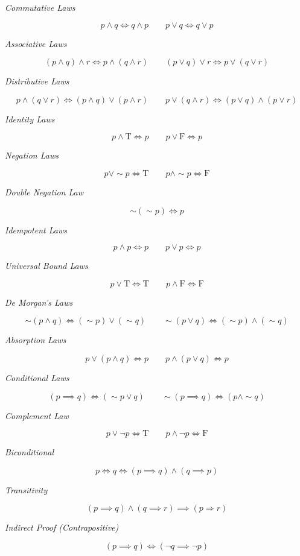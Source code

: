 \emph{Commutative Laws}

\[
	p \land q \iff q \land p \qquad p \lor q \iff q \lor p
\]

\emph{Associative Laws}

\[
	(p \land q) \land r \iff p \land (q \land r) \qquad (p \lor q) \lor r \iff p \lor (q \lor r)
\]

\emph{Distributive Laws}

\[
	p \land (q \lor r) \iff (p \land q) \lor (p \land r) \qquad
	p \lor (q \land r) \iff (p \lor q) \land (p \lor r)
\]

\emph{Identity Laws}

\[
	p \land \text{T} \iff p \qquad p \lor \text{F} \iff p
\]

\emph{Negation Laws}

\[
	p \lor \sim p \iff \text{T} \qquad p \land \sim p \iff \text{F}
\]

\emph{Double Negation Law}

\[
	\sim(\sim p) \iff p
\]

\emph{Idempotent Laws}

\[
	p \land p \iff p \qquad p \lor p \iff p
\]

\emph{Universal Bound Laws}

\[
	p \lor \text{T} \iff \text{T} \qquad p \land \text{F} \iff \text{F}
\]

\emph{De Morgan’s Laws}

\[
	\sim (p \land q) \iff (\sim p) \lor (\sim q) \qquad
	\sim (p \lor q) \iff (\sim p) \land (\sim q)
\]

\emph{Absorption Laws}

\[
	p \lor (p \land q) \iff p \qquad p \land (p \lor q) \iff p
\]

\emph{Conditional Laws}

\[
	(p \implies q) \iff (\sim p \lor q) \qquad \sim(p \implies q) \iff (p \land \sim q)
\]

\emph{Complement Law}

\[
	p \lor \neg p \iff \text{T} \qquad p \land \neg p \iff \text{F}
\]

\emph{Biconditional}

\[
	p \iff q \iff (p \implies q) \land (q \implies p)
\]

\emph{Transitivity}

\[
	(p \implies q) \land (q \implies r) \implies (p \Rightarrow r)
\]

\emph{Indirect Proof (Contrapositive)}

\[
	(p \implies q) \iff (\neg q \implies \neg p)
\]


